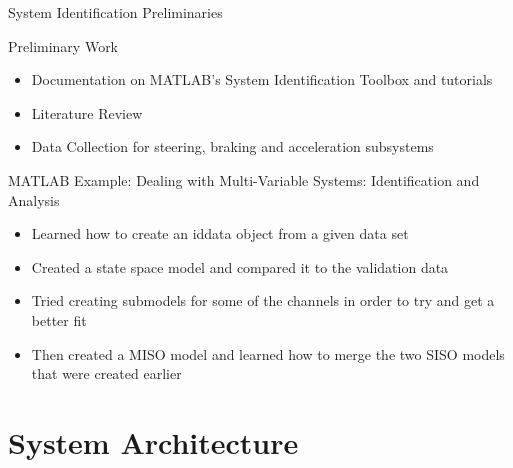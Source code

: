 \documentclass{beamer}
\begin{document}
\begin{frame}{System Identification Preliminaries}{}
  \begin{block}{Preliminary Work}
 \begin{itemize}
        \item Documentation on MATLAB's System Identification Toolbox and tutorials
        \item Literature Review 
        \item Data Collection for steering, braking and acceleration subsystems
\end{itemize}
  \end{block}
  
   \begin {block}{MATLAB Example: Dealing with Multi-Variable Systems: Identification and Analysis}
  \begin{itemize}
  	\item  Learned how to create an iddata object from a given data set 
  	\item Created a state space model and compared it to the validation data 
  	\item Tried creating submodels for some of the channels in order to try and get a better fit 
  	\item Then created a MISO model and learned how to merge the two SISO models that were created earlier 
  	\end{itemize}
  	\end{block}
\end{frame}

\section{System Architecture}
\end{document}
